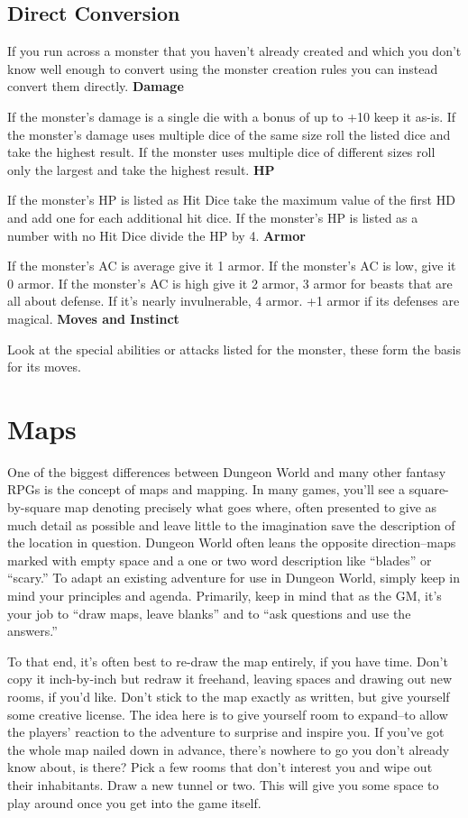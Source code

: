 \subsection{Direct Conversion}


 If you run across a monster that you haven't already created and which you don't know well enough to convert using the monster creation rules you can instead convert them directly.
\textbf{Damage}


 If the monster's damage is a single die with a bonus of up to +10 keep it as-is. If the monster's damage uses multiple dice of the same size roll the listed dice and take the highest result. If the monster uses multiple dice of different sizes roll only the largest and take the highest result.
\textbf{HP}


 If the monster's HP is listed as Hit Dice take the maximum value of the first HD and add one for each additional hit dice. If the monster's HP is listed as a number with no Hit Dice divide the HP by 4.
\textbf{Armor}


 If the monster's AC is average give it 1 armor. If the monster's AC is low, give it 0 armor. If the monster's AC is high give it 2 armor, 3 armor for beasts that are all about defense. If it's nearly invulnerable, 4 armor. +1 armor if its defenses are magical.
\textbf{Moves and Instinct}


 Look at the special abilities or attacks listed for the monster, these form the basis for its moves.
\section{Maps}


 One of the biggest differences between Dungeon World and many other fantasy RPGs is the concept of maps and mapping. In many games, you'll see a square-by-square map denoting precisely what goes where, often presented to give as much detail as possible and leave little to the imagination save the description of the location in question. Dungeon World often leans the opposite direction--maps marked with empty space and a one or two word description like ``blades'' or ``scary.'' To adapt an existing adventure for use in Dungeon World, simply keep in mind your principles and agenda. Primarily, keep in mind that as the GM, it's your job to ``draw maps, leave blanks'' and to ``ask questions and use the answers.''


 To that end, it's often best to re-draw the map entirely, if you have time. Don't copy it inch-by-inch but redraw it freehand, leaving spaces and drawing out new rooms, if you'd like. Don't stick to the map exactly as written, but give yourself some creative license. The idea here is to give yourself room to expand--to allow the players' reaction to the adventure to surprise and inspire you. If you've got the whole map nailed down in advance, there's nowhere to go you don't already know about, is there? Pick a few rooms that don't interest you and wipe out their inhabitants. Draw a new tunnel or two. This will give you some space to play around once you get into the game itself.


